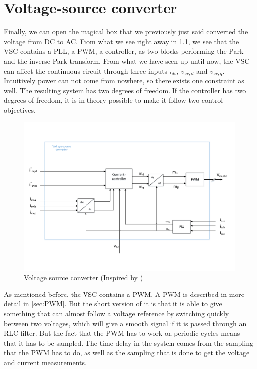 \chapter{Voltage-source converter}
\label{chp:VSC}

Finally, we can open the magical box that we previously just said converted the voltage from DC to AC. From what we see right away in \cref{fig:internals_of_VSC}, we see that the \gls{VSC} contains a \gls{PLL}, a \gls{PWM}, a controller, as two blocks performing the Park and the inverse Park transform. From what we have seen up until now, the \gls{VSC} can affect the continuous circuit through three inputs $i_{dc}$, $v_{cv,d}$ and $v_{cv,q}$. Intuitively power can not come from nowhere, so there exists one constraint as well. The resulting system has two degrees of freedom. If the controller has two degrees of freedom, it is in theory possible to make it follow two control objectives. 

\begin{figure}[ht]
 \centering
 \includegraphics[width=\textwidth,height=\textheight,keepaspectratio]{Figures/Internals_of_the_converter.pdf}
 \caption{Voltage source converter (Inspired by \cite{Suul_electro_presentation_1})}
 \label{fig:internals_of_VSC}
\end{figure}{}

As mentioned before, the \gls{VSC} contains a \gls{PWM}. A \gls{PWM} is described in more detail in \cref{sec:PWM}. But the short version of it is that it is able to give something that can almost follow a voltage reference by switching quickly between two voltages, which will give a smooth signal if it is passed through an RLC-filter. But the fact that the \gls{PWM} has to work on periodic cycles means that it has to be sampled. The time-delay in the system comes from the sampling that the \gls{PWM} has to do, as well as the sampling that is done to get the voltage and current measurements. 

